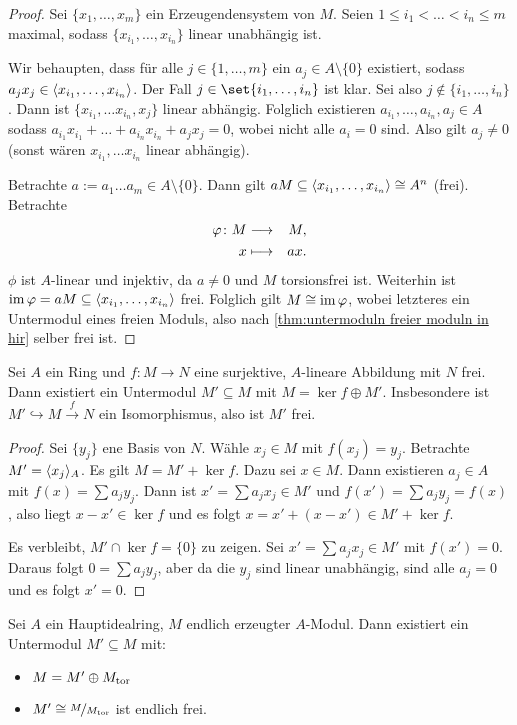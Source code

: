 \documentclass[12pt,a4paper]{scrartcl}
\theoremstyle{cplain}
\theoremstyle{cdef}
\begin{document}
\begin{proof}
	Sei $\{x_1,\dots, x_m\}$ ein Erzeugendensystem von $M$. Seien $1\le i_1<\dots<i_n\le m$ maximal, sodass $\{x_{i_1},\dots, x_{i_n}\}$ linear unabhängig ist.
	
	Wir behaupten, dass für alle $j\in\{1,\dots, m\}$ ein $a_j\in A\setminus \{0\}$ existiert, sodass $a_jx_j\in\langle x_{i_1},\dots, x_{i_n}\rangle$. Der Fall $j \in \set{i_1,\ldots,i_n}$ ist klar. Sei also $j\notin \{i_1,\dots, i_n\}$. Dann ist $\{x_{i_1},\dots x_{i_n}, x_j\}$ linear abhängig. Folglich existieren $a_{i_1},\dots, a_{i_n}, a_j\in A$ sodass $a_{i_1}x_{i_1}+\dots+a_{i_n}x_{i_n}+a_jx_j = 0$, wobei nicht alle $a_i = 0$ sind. Also gilt $a_j\neq 0$ (sonst wären $x_{i_1},\dots x_{i_n}$ linear abhängig).
	
	Betrachte $a := a_1\dots a_m\in A\setminus\{0\}$. Dann gilt $aM\subseteq\langle x_{i_1},\dots, x_{i_n}\rangle\cong A^n$ (frei). Betrachte
	\begin{eqnarray*}
		\varphi\colon M & \longrightarrow & M,\\
		x & \longmapsto & ax.
	\end{eqnarray*}
	$\phi$ ist $A$-linear und injektiv, da $a \neq 0$ und $M$ torsionsfrei ist. Weiterhin ist $\operatorname{im}\varphi = aM\subseteq \langle x_{i_1},\dots, x_{i_n}\rangle$ frei. Folglich gilt $M\cong \operatorname{im}\varphi$, wobei letzteres ein Untermodul eines freien Moduls, also nach \cref{thm:untermoduln freier moduln in hir} selber frei ist.
\end{proof}
\begin{lem} \label{lem:4.8}
	Sei $A$ ein Ring und $f\colon M\to N$ eine surjektive, $A$-lineare Abbildung mit $N$ frei. Dann existiert ein Untermodul $M'\subseteq M$ mit $M = \ker f\oplus M'$. Insbesondere ist $M'\hookrightarrow M\xrightarrow{f}N$ ein Isomorphismus, also ist $M'$ frei.
\end{lem}
\begin{proof}
	Sei $\{y_j\}$ ene Basis von $N$. Wähle $x_j\in M$ mit $f(x_j) = y_j$. Betrachte $M'= \langle x_j\rangle_A$. Es gilt $M = M' + \ker f$. Dazu sei $x\in M$. Dann existieren $a_j\in A$ mit $f(x)= \sum a_jy_j$. Dann ist $x'=\sum a_jx_j\in M'$ und $f(x') = \sum a_jy_j = f(x)$, also liegt $x-x'\in \ker f$ und es folgt $x = x'+(x-x')\in M'+\ker f$.
	
	Es verbleibt, $M'\cap \ker f = \{0\}$ zu zeigen. Sei $x' = \sum a_jx_j\in M'$ mit $f(x') = 0$. Daraus folgt $0 = \sum a_jy_j$, aber da die $y_j$ sind linear unabhängig, sind alle $a_j = 0$ und es folgt $x' = 0$.
\end{proof}
\begin{satz}
	Sei $A$ ein Hauptidealring, $M$ endlich erzeugter $A$-Modul. Dann existiert ein Untermodul $M'\subseteq M$ mit:
	\begin{itemize}
		\item $M = M'\oplus M_{\operatorname{tor}}$
		\item $M'\cong \nicefrac{M}{M_{\operatorname{tor}}}$ ist endlich frei.
	\end{itemize}
\end{satz}
\end{document}
